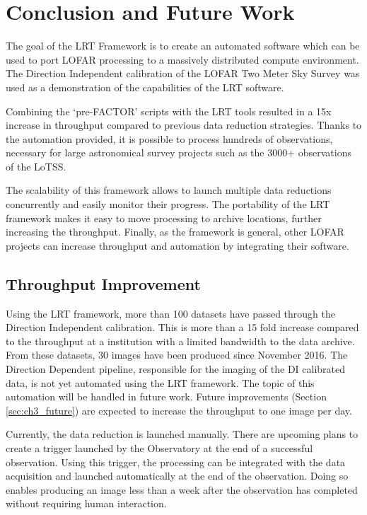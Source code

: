 \section{Conclusion and Future Work}\label{sec:ch3_conclusion}

The goal of the LRT Framework is to create an automated software which can be used to port LOFAR processing to a massively distributed compute environment. The Direction Independent calibration of the LOFAR Two Meter Sky Survey was used as a demonstration of the capabilities of the LRT software. 

Combining the `pre-FACTOR' scripts with the LRT tools resulted in a 15x increase in throughput compared to previous data reduction strategies. Thanks to the automation provided, it is possible to process hundreds of observations, necessary for large astronomical survey projects such as the 3000+ observations of the LoTSS. 

The scalability of this framework allows to launch multiple data reductions concurrently and easily monitor their progress. The portability of the LRT framework makes it easy to move processing to archive locations, further increasing the throughput. Finally, as the framework is general, other LOFAR projects can increase throughput and automation by integrating their software. 


\subsection{Throughput Improvement}

Using the LRT framework, more than 100 datasets have passed through the Direction Independent calibration. This is more than a 15 fold increase compared to the throughput at a institution with a limited bandwidth to the data archive. From these datasets, 30 images have been produced since November 2016.  The Direction Dependent pipeline, responsible for the imaging of the DI calibrated data, is not yet automated using the LRT framework. The topic of this automation will be handled in future work. Future improvements (Section \ref{sec:ch3_future}) are expected to increase the throughput to one image per day.  

Currently, the data reduction is launched manually. There are upcoming plans to create a trigger launched by the Observatory at the end of a successful observation. Using this trigger, the processing can be integrated with the data acquisition and launched automatically at the end of the observation. Doing so enables producing an image less than a week after the observation has completed without requiring human interaction. 
% 
